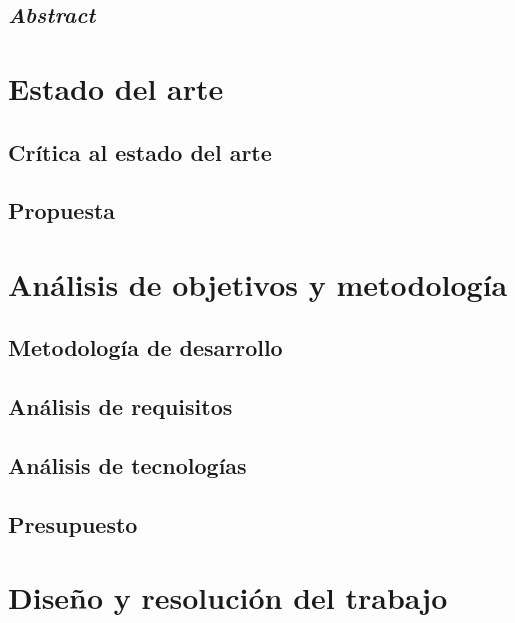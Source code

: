 \documentclass[10pt, a4paper]{aqademic}
\begin{document}
\section{\textit{Abstract}}


\chapter{Estado del arte}

\section{Crítica al estado del arte}

\section{Propuesta}


\chapter{Análisis de objetivos y metodología}

\section{Metodología de desarrollo}

\section{Análisis de requisitos}

\section{Análisis de tecnologías}

\section{Presupuesto}


\chapter{Diseño y resolución del trabajo}
\end{document}
